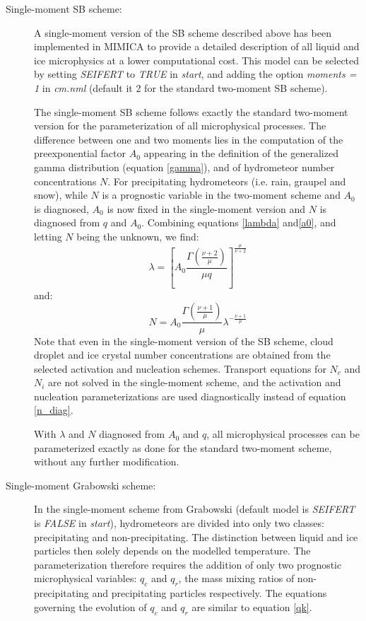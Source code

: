 \documentclass[12pt,A4,french]{article}
\begin{document}
\begin{description}
\item[Single-moment SB scheme:]

A single-moment version of the SB scheme described above has been implemented in MIMICA to provide a detailed description of all liquid and ice microphysics at a lower computational cost. This model can be selected by setting {\it SEIFERT} to {\it TRUE} in {\it start}, and adding the option {\it moments = 1} in {\it cm.nml} (default it 2 for the standard two-moment SB scheme).

The single-moment SB scheme follows exactly the standard two-moment version for the parameterization of all microphysical processes. The difference between one and two moments lies in the computation of the preexponential factor $A_0$ appearing in the definition of the generalized gamma distribution (equation \ref{gamma}), and of hydrometeor number concentrations $N$. For precipitating hydrometeors (i.e. rain, graupel and snow), while $N$ is a prognostic variable in the two-moment scheme and $A_0$ is diagnosed, $A_0$ is now fixed in the single-moment version and $N$ is diagnosed from $q$ and $A_0$. Combining equations \ref{lambda} and\ref{a0}, and letting $N$ being the unknown, we find:
\begin{equation}
    \lambda = \left[A_0 \frac{\Gamma\left(\frac{\nu + 2}{\mu}\right)}{\mu q}\right]^{\frac{\mu}{\nu + 2}}
\end{equation}
and:
\begin{equation}
    N =  A_0 \frac{\Gamma\left(\frac{\nu + 1}{\mu}\right)}{\mu} \lambda^{-\frac{\nu + 1}{\mu}}
    \label{n_diag}
\end{equation}
Note that even in the single-moment version of the SB scheme, cloud droplet and ice crystal number concentrations are obtained from the selected activation and nucleation schemes. Transport equations for $N_c$ and $N_i$ are not solved in the single-moment scheme, and the activation and nucleation parameterizations are used diagnostically instead of equation \ref{n_diag}.

With $\lambda$ and $N$ diagnosed from $A_0$ and $q$, all microphysical processes can be parameterized exactly as done for the standard two-moment scheme, without any further modification.

\item[Single-moment Grabowski scheme:]

In the single-moment scheme from Grabowski \cite{Gra1998} (default model is {\it SEIFERT} is {\it FALSE} in {\it start}), hydrometeors are divided into only two classes: precipitating and non-precipitating. The distinction between liquid and ice particles then solely depends on the modelled temperature. The parameterization therefore requires the addition of only two prognostic microphysical variables: $q_c$ and $q_r$, the mass mixing ratios of non-precipitating and precipitating particles respectively. The equations governing the evolution of $q_c$ and $q_r$ are similar to equation \ref{qk}.


\end{description}
\end{document}
